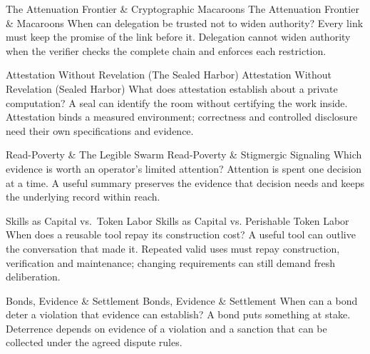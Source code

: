 \expandafter\def\csname pdlandmarktitle@06\endcsname{The Attenuation Frontier \& Cryptographic Macaroons}
\expandafter\def\csname pdlandmarkconcept@06\endcsname{The Attenuation Frontier \& Macaroons}
\expandafter\def\csname pdlandmarkquestion@06\endcsname{When can delegation be trusted not to widen authority?}
\expandafter\def\csname pdlandmarkquote@06\endcsname{Every link must keep the promise of the link before it. Delegation cannot widen authority when the verifier checks the complete chain and enforces each restriction.}

\expandafter\def\csname pdlandmarktitle@07\endcsname{Attestation Without Revelation (The Sealed Harbor)}
\expandafter\def\csname pdlandmarkconcept@07\endcsname{Attestation Without Revelation (Sealed Harbor)}
\expandafter\def\csname pdlandmarkquestion@07\endcsname{What does attestation establish about a private computation?}
\expandafter\def\csname pdlandmarkquote@07\endcsname{A seal can identify the room without certifying the work inside. Attestation binds a measured environment; correctness and controlled disclosure need their own specifications and evidence.}

\expandafter\def\csname pdlandmarktitle@08\endcsname{Read-Poverty \& The Legible Swarm}
\expandafter\def\csname pdlandmarkconcept@08\endcsname{Read-Poverty \& Stigmergic Signaling}
\expandafter\def\csname pdlandmarkquestion@08\endcsname{Which evidence is worth an operator's limited attention?}
\expandafter\def\csname pdlandmarkquote@08\endcsname{Attention is spent one decision at a time. A useful summary preserves the evidence that decision needs and keeps the underlying record within reach.}

\expandafter\def\csname pdlandmarktitle@09\endcsname{Skills as Capital vs.\ Token Labor}
\expandafter\def\csname pdlandmarkconcept@09\endcsname{Skills as Capital vs. Perishable Token Labor}
\expandafter\def\csname pdlandmarkquestion@09\endcsname{When does a reusable tool repay its construction cost?}
\expandafter\def\csname pdlandmarkquote@09\endcsname{A useful tool can outlive the conversation that made it. Repeated valid uses must repay construction, verification and maintenance; changing requirements can still demand fresh deliberation.}

\expandafter\def\csname pdlandmarktitle@10\endcsname{Bonds, Evidence \& Settlement}
\expandafter\def\csname pdlandmarkconcept@10\endcsname{Bonds, Evidence \& Settlement}
\expandafter\def\csname pdlandmarkquestion@10\endcsname{When can a bond deter a violation that evidence can establish?}
\expandafter\def\csname pdlandmarkquote@10\endcsname{A bond puts something at stake. Deterrence depends on evidence of a violation and a sanction that can be collected under the agreed dispute rules.}

